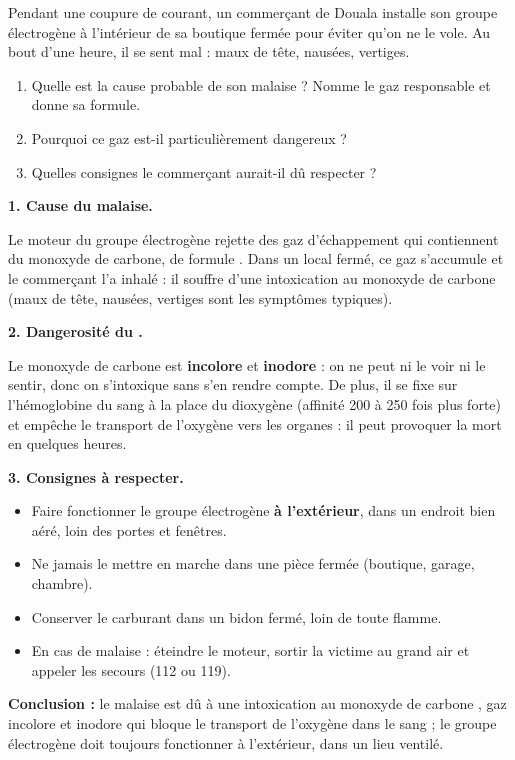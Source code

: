 \documentclass[11pt]{article}
\newcommand{\cle}[1]{{\popxbold\color{popdark}#1}}
\begin{document}
\begin{exoresolu}
Pendant une coupure de courant, un commerçant de Douala installe son groupe électrogène à l'intérieur de sa boutique fermée pour éviter qu'on ne le vole. Au bout d'une heure, il se sent mal : maux de tête, nausées, vertiges.
\begin{enumerate}
\item Quelle est la cause probable de son malaise ? Nomme le gaz responsable et donne sa formule.
\item Pourquoi ce gaz est-il particulièrement dangereux ?
\item Quelles consignes le commerçant aurait-il dû respecter ?
\end{enumerate}
\tcblower
\textbf{1. Cause du malaise.}

Le moteur du groupe électrogène rejette des gaz d'échappement qui contiennent du \cle{monoxyde de carbone}, de formule . Dans un local fermé, ce gaz s'accumule et le commerçant l'a inhalé : il souffre d'une intoxication au monoxyde de carbone (maux de tête, nausées, vertiges sont les symptômes typiques).

\textbf{2. Dangerosité du .}

Le monoxyde de carbone est \textbf{incolore} et \textbf{inodore} : on ne peut ni le voir ni le sentir, donc on s'intoxique sans s'en rendre compte. De plus, il se fixe sur l'hémoglobine du sang à la place du dioxygène (affinité 200 à 250 fois plus forte) et empêche le transport de l'oxygène vers les organes : il peut provoquer la mort en quelques heures.

\textbf{3. Consignes à respecter.}
\begin{itemize}
\item Faire fonctionner le groupe électrogène \textbf{à l'extérieur}, dans un endroit bien aéré, loin des portes et fenêtres.
\item Ne jamais le mettre en marche dans une pièce fermée (boutique, garage, chambre).
\item Conserver le carburant dans un bidon fermé, loin de toute flamme.
\item En cas de malaise : éteindre le moteur, sortir la victime au grand air et appeler les secours (112 ou 119).
\end{itemize}

\textbf{Conclusion :} le malaise est dû à une intoxication au monoxyde de carbone , gaz incolore et inodore qui bloque le transport de l'oxygène dans le sang ; le groupe électrogène doit toujours fonctionner à l'extérieur, dans un lieu ventilé.
\end{exoresolu}
\end{document}
